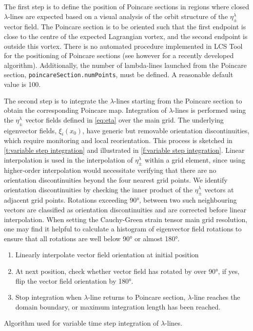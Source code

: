 \documentclass[5p]{elsarticle}
\begin{document}
The first step is to define the position of Poincare sections in regions where closed $\lambda$-lines are expected based on a visual analysis of the orbit structure of the $\eta_\pm^\lambda$ vector field. The Poincare section is to be oriented such that the first endpoint is close to the centre of the expected Lagrangian vortex, and the second endpoint is outside this vortex. There is no automated procedure implemented in LCS Tool for the positioning of Poincare sections (see however \citet{karrasch14:_autom_lagran} for a recently developed algorithm). Additionally, the number of lambda-lines launched from the Poincare section, \lstinline!poincareSection.numPoints!, must be defined. A reasonable default value is 100.

The second step is to integrate the $\lambda$-lines  starting from the Poincare section to obtain the corresponding Poincare map. Integration of $\lambda$-lines is performed using the $\eta_\pm^\lambda$ vector fields defined in \cref{eq:eta} over the main grid. The underlying eigenvector fields, $\xi_i(x_0)$, have generic but removable orientation discontinuities, which require monitoring and local reorientation. This process is sketched in \cref{t:variable step integration} and illustrated in \cref{f:variable step integration}. Linear interpolation is used in the interpolation of $\eta_\pm^\lambda$ within a grid element, since using higher-order interpolation would necessitate verifying that there are no orientation discontinuities beyond the four nearest grid points. We identify orientation discontinuities by checking the inner product of the $\eta_\pm^\lambda$ vectors at adjacent grid points. Rotations exceeding 90°, between two such neighbouring vectors are classified as orientation discontinuities and are corrected before linear interpolation. When setting the Cauchy-Green strain tensor main grid resolution, one may find it helpful to calculate a histogram of eigenvector field rotations to ensure that all rotations are well below 90° or almost 180°.

\begin{table}
\begin{enumerate}
\item Linearly interpolate vector field orientation at initial position
\item At next position, check whether vector field has rotated by over 90°, if yes, flip the vector field orientation by 180°.
\item Stop integration when $\lambda$-line returns to Poincare section, $\lambda$-line reaches the domain boundary, or maximum integration length has been reached.
\end{enumerate}
\caption{Algorithm used for variable time step integration of $\lambda$-lines.}
\label{t:variable step integration}
\end{table}
\end{document}
